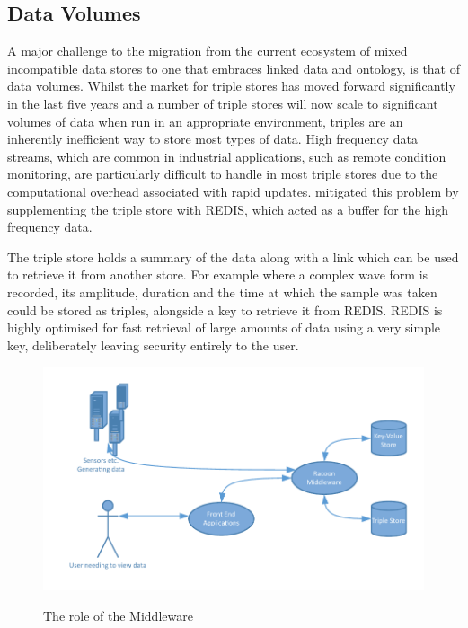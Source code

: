 \subsection{Data Volumes}

A major challenge to the migration from the current ecosystem of mixed incompatible data stores to one that embraces linked data and ontology, is that of data volumes. Whilst the market for triple stores has moved forward significantly in the last five years and a number of triple stores will now scale to significant volumes of data when run in an appropriate environment, triples are an inherently inefficient way to store most types of data. High frequency data streams, which are common in industrial applications, such as remote condition monitoring, are particularly difficult to handle in most triple stores due to the computational overhead associated with rapid updates. \citet{Tutcher2015} mitigated this problem by supplementing the triple store with REDIS, which acted as a buffer for the high frequency data.

The triple store holds a summary of the data along with a link which can be used to retrieve it from another store. For example where a complex wave form is recorded, its amplitude, duration and the time at which the sample was taken could be stored as triples, alongside a key to retrieve it from REDIS. REDIS is highly optimised for fast retrieval of large amounts of data using a very simple key, deliberately leaving security entirely to the user.

 \begin{figure}[H]
\myfloatalign
{\includegraphics[width=\linewidth]{gfx/Middleware_role}} 
\caption{The role of the Middleware}
\label{fig:MiddlewareRole}
\end{figure}


